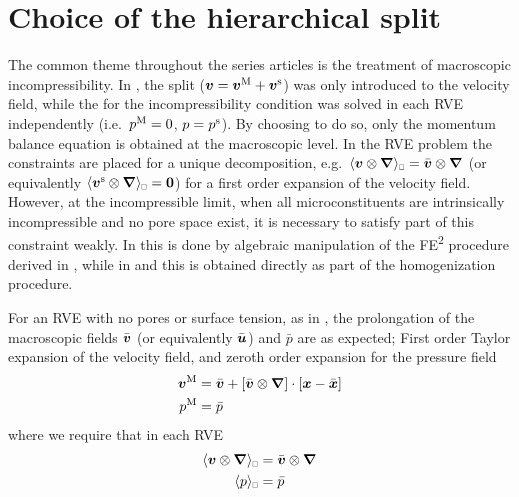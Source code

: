 \documentclass[MikaelDissertation.tex]{subfiles}
\begin{document}
\section{Choice of the hierarchical split}
The common theme throughout the series articles is the treatment of macroscopic incompressibility.
In , the split ($\boldsymbol{v} = \boldsymbol{v}^{\mathrm{M}} + \boldsymbol{v}^{\mathrm{s}}$) was only introduced to the velocity field, while the for the incompressibility condition was solved in each RVE independently (i.e.\ $p^{\mathrm{M}} = 0$, $p = p^{\mathrm{s}}$).
By choosing to do so, only the momentum balance equation is obtained at the macroscopic level.
In the RVE problem the constraints are placed for a unique decomposition, e.g.\ $\homgen{\ta v \outerp\diff} = \bar{\ta v}\outerp\diff$ (or equivalently $\homgen{\ta v^\fluct\outerp\diff} = \ts 0$) for a first order expansion of the velocity field.
However, at the incompressible limit, when all microconstituents are intrinsically incompressible and no pore space exist, it is necessary to satisfy part of this constraint weakly.
In  this is done by algebraic manipulation of the FE\textsuperscript{2} procedure derived in , while in  and  this is obtained directly as part of the homogenization procedure.


For an RVE with no pores or surface tension, as in , the prolongation of the macroscopic fields $\bar{\boldsymbol{v}}$ (or equivalently $\bar{\boldsymbol{u}}$) and $\bar{p}$ are as expected;
First order Taylor expansion of the velocity field, and zeroth order expansion for the pressure field
\begin{align}
 \boldsymbol{v}^{\mathrm{M}} &= \bar{\boldsymbol{v}} + [\bar{\boldsymbol{v}}\mathbin{\otimes}\boldsymbol{\nabla}]\cdot[\boldsymbol{x} - \bar{\boldsymbol{x}}]
\\
 p^{\mathrm{M}} &= \bar{p}
\end{align}
where we require that in each RVE
\begin{align}
 \homgen{\ta v\outerp\diff} &= \bar{\ta v}\outerp\diff
\\
 \homgen{p} &= \bar{p}
\end{align}
\end{document}
